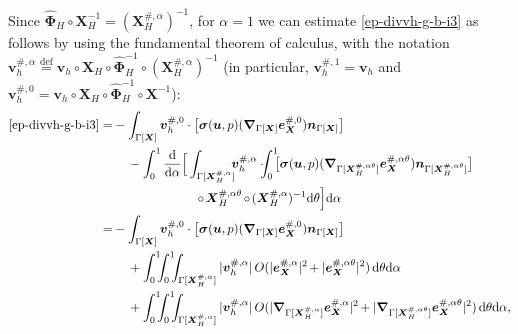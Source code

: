 \documentclass[11pt,reqno]{amsart}
\theoremstyle{definition}
\theoremstyle{plain}
\numberwithin{theorem}{section}
\numberwithin{proposition}{section}
\numberwithin{lemma}{section}
\numberwithin{equation}{section}
\newcommand{\bs}[1]{\boldsymbol{#1}}
\newcommand{\uu}[1]  {{\bs{#1}} }
\newcommand{\grad}   { \uu{\nabla}    }
\def\d{\mathrm{d}}
\newcommand{\bv}{{\bs v}}
\newcommand{\bu}{\uu{u}}
\renewcommand{\(}{\bigl(}
\renewcommand{\)}{\bigr)}
\def\eqd{\stackrel{\mathrm{def}}{=}}
\begin{document}
Since $\widehat{\bs\Phi}_H \circ{\bs X}_H^{-1}= ({\bs X}_H^{\#,\alpha})^{-1}$, for $\alpha=1$ we can estimate \eqref{ep-divvh-g-b-i3} as follows by using the fundamental theorem of calculus, with the notation ${\bs v}_h^{\#,\alpha}\eqd \bv_h\circ{\bs X}_H\circ\widehat{\bs\Phi}_H^{-1}\circ ({\bs X}_H^{\#,\alpha})^{-1}$ (in particular, ${\bs v}_h^{\#,1}=\bv_h$ and ${\bs v}_h^{\#,0}=\bv_h\circ{\bs X}_H\circ\widehat{\bs\Phi}_H^{-1}\circ {\bs X}^{-1}$):
\begin{subequations}
\begin{align}
\eqref{ep-divvh-g-b-i3} 
= & - \int_{\Gamma[\bs X]} {\bs v}_h^{\#,0} \cdot \big[{\bs\sigma}(\bu,p) (\grad_{\Gamma[\bs X]}{\bs e}_{\bs X}^{\#,0}){\bs n}_{\Gamma[\bs X]} \big] \notag\\
&\quad\, - \int_0^1 \frac{\d}{\d\alpha}\Big[\int_{\Gamma[{\bs X}_H^{\#,\alpha}]}\hspace{-5pt} {\bs v}_h^{\#,\alpha} \cdot \hspace{-5pt}\int_0^1\hspace{-5pt} \big[{\bs\sigma}(\bu,p) (\grad_{\Gamma[{\bs X}_H^{\#,\alpha\theta}]}{\bs e}_{\bs X}^{\#,\alpha\theta}){\bs n}_{\Gamma[{\bs X}_H^{\#,\alpha\theta}]} \big]\notag\\
&\hspace{65pt}\circ\hspace{-1pt}{\bs X}_H^{\#,\alpha\theta}\hspace{-1pt}\circ\hspace{-1pt}({\bs X}_H^{\#,\alpha})^{-1} \d\theta \Big]\d\alpha \notag\\
= & - \int_{\Gamma[\bs X]} {\bs v}_h^{\#,0} \cdot \big[{\bs\sigma}(\bu,p) (\grad_{\Gamma[\bs X]}{\bs e}_{\bs X}^{\#,0}){\bs n}_{\Gamma[\bs X]} \big] \label{sigma-e-n-1} \\ 
&\quad\, + \int_0^1\hspace{-5pt}\int_0^1\hspace{-5pt} \int_{\Gamma[{\bs X}_H^{\#,\alpha}]} |{\bs v}_h^{\#,\alpha}| \, O(|{\bs e}_{\bs X}^{\#,\alpha}|^2\hspace{-1pt} + |{\bs e}_{\bs X}^{\#,\alpha\theta}|^2) \, \d\theta\d\alpha \notag\\
&\quad\, + \int_0^1\hspace{-5pt}\int_0^1\hspace{-5pt} \int_{\Gamma[{\bs X}_H^{\#,\alpha}]} |{\bs v}_h^{\#,\alpha}| \, O(|\grad_{\Gamma[{\bs X}_H^{\#,\alpha}]} {\bs e}_{\bs X}^{\#,\alpha}|^2\hspace{-1pt} + |\grad_{\Gamma[{\bs X}_H^{\#,\alpha\theta}]} {\bs e}_{\bs X}^{\#,\alpha\theta}|^2) \, \d\theta\d\alpha , \label{sigma-e-n-2}
\end{align} 
\end{subequations}
\end{document}
